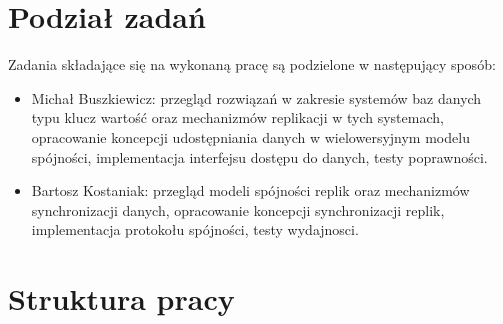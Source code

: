 \section{Podział zadań}
Zadania składające się na wykonaną pracę są podzielone w następujący sposób:
\begin{itemize}
    \item Michał Buszkiewicz: przegląd rozwiązań w zakresie systemów baz danych typu klucz wartość oraz mechanizmów replikacji w tych systemach, opracowanie koncepcji udostępniania danych w wielowersyjnym modelu spójności, implementacja interfejsu dostępu do danych, testy poprawności.
    \item Bartosz Kostaniak: przegląd modeli spójności replik oraz mechanizmów synchronizacji danych, opracowanie koncepcji synchronizacji replik, implementacja protokołu spójności, testy wydajnosci.
\end{itemize}


\section{Struktura pracy}






